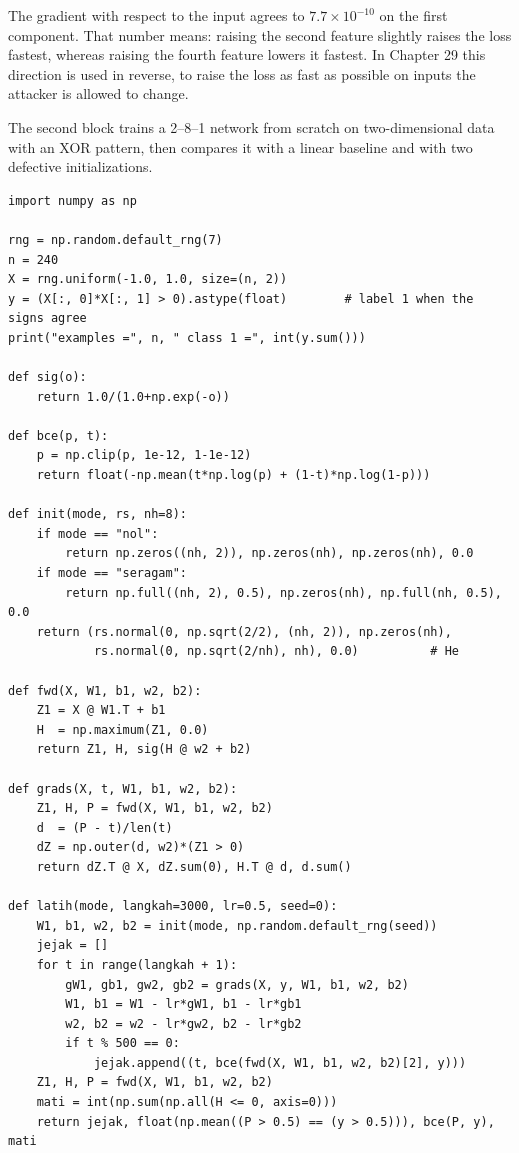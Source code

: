 The gradient with respect to the input agrees to $7.7\times10^{-10}$ on the first component. That
number means: raising the second feature slightly raises the loss fastest, whereas raising the
fourth feature lowers it fastest. In Chapter 29 this direction is used in reverse, to raise the
loss as fast as possible on inputs the attacker is allowed to change.

The second block trains a 2--8--1 network from scratch on two-dimensional data with an XOR
pattern, then compares it with a linear baseline and with two defective initializations.

\begin{lab}
\begin{verbatim}
import numpy as np

rng = np.random.default_rng(7)
n = 240
X = rng.uniform(-1.0, 1.0, size=(n, 2))
y = (X[:, 0]*X[:, 1] > 0).astype(float)        # label 1 when the signs agree
print("examples =", n, " class 1 =", int(y.sum()))

def sig(o):
    return 1.0/(1.0+np.exp(-o))

def bce(p, t):
    p = np.clip(p, 1e-12, 1-1e-12)
    return float(-np.mean(t*np.log(p) + (1-t)*np.log(1-p)))

def init(mode, rs, nh=8):
    if mode == "nol":
        return np.zeros((nh, 2)), np.zeros(nh), np.zeros(nh), 0.0
    if mode == "seragam":
        return np.full((nh, 2), 0.5), np.zeros(nh), np.full(nh, 0.5), 0.0
    return (rs.normal(0, np.sqrt(2/2), (nh, 2)), np.zeros(nh),
            rs.normal(0, np.sqrt(2/nh), nh), 0.0)          # He

def fwd(X, W1, b1, w2, b2):
    Z1 = X @ W1.T + b1
    H  = np.maximum(Z1, 0.0)
    return Z1, H, sig(H @ w2 + b2)

def grads(X, t, W1, b1, w2, b2):
    Z1, H, P = fwd(X, W1, b1, w2, b2)
    d  = (P - t)/len(t)
    dZ = np.outer(d, w2)*(Z1 > 0)
    return dZ.T @ X, dZ.sum(0), H.T @ d, d.sum()

def latih(mode, langkah=3000, lr=0.5, seed=0):
    W1, b1, w2, b2 = init(mode, np.random.default_rng(seed))
    jejak = []
    for t in range(langkah + 1):
        gW1, gb1, gw2, gb2 = grads(X, y, W1, b1, w2, b2)
        W1, b1 = W1 - lr*gW1, b1 - lr*gb1
        w2, b2 = w2 - lr*gw2, b2 - lr*gb2
        if t % 500 == 0:
            jejak.append((t, bce(fwd(X, W1, b1, w2, b2)[2], y)))
    Z1, H, P = fwd(X, W1, b1, w2, b2)
    mati = int(np.sum(np.all(H <= 0, axis=0)))
    return jejak, float(np.mean((P > 0.5) == (y > 0.5))), bce(P, y), mati


\end{verbatim}
\end{lab}
